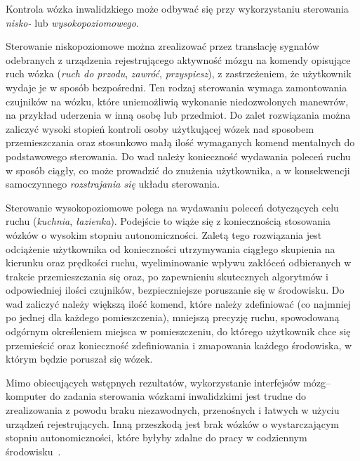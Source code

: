 \documentclass[skorowidz,skroty]{dyplomWEZUT}
\begin{document}
Kontrola wózka inwalidzkiego może odbywać się przy wykorzystaniu sterowania \textit{nisko-} lub \textit{wysokopoziomowego}.

Sterowanie niskopoziomowe można zrealizować przez translację sygnałów odebranych z urządzenia rejestrującego aktywność mózgu na komendy opisujące ruch wózka (\textit{ruch do przodu}, \textit{zawróć}, \textit{przyspiesz}), z zastrzeżeniem, że użytkownik wydaje je w sposób bezpośredni. Ten rodzaj sterowania wymaga zamontowania czujników na wózku, które uniemożliwią wykonanie niedozwolonych manewrów, na przykład uderzenia w inną osobę lub przedmiot. Do zalet rozwiązania można zaliczyć wysoki stopień kontroli osoby użytkującej wózek nad sposobem przemieszczania oraz stosunkowo małą ilość wymaganych komend mentalnych do podstawowego sterowania. Do wad należy konieczność wydawania poleceń ruchu w sposób ciągły, co może prowadzić do znużenia użytkownika, a w konsekwencji samoczynnego \textit{rozstrajania się} układu sterowania.

Sterowanie wysokopoziomowe polega na wydawaniu poleceń dotyczących celu ruchu (\textit{kuchnia}, \textit{łazienka}). Podejście to wiąże się z koniecznością stosowania wózków o wysokim stopniu autonomiczności. Zaletą tego rozwiązania jest odciążenie użytkownika od konieczności utrzymywania ciągłego skupienia na kierunku oraz prędkości ruchu, wyeliminowanie wpływu zakłóceń odbieranych w trakcie przemieszczania się oraz, po zapewnieniu skutecznych algorytmów i odpowiedniej ilości czujników, bezpieczniejsze poruszanie się w środowisku. Do wad zaliczyć należy większą ilość komend, które należy zdefiniować (co najmniej po jednej dla każdego pomieszczenia), mniejszą precyzję ruchu, spowodowaną odgórnym określeniem miejsca w pomieszczeniu, do którego użytkownik chce się przemieścić oraz konieczność zdefiniowania i zmapowania każdego środowiska, w którym będzie poruszał się wózek.

Mimo obiecujących wstępnych rezultatów, wykorzystanie interfejsów mózg--kom\-pu\-ter do zadania sterowania wózkami inwalidzkimi jest trudne do zrealizowania z powodu braku niezawodnych, przenośnych i łatwych w użyciu urządzeń rejestrujących. Inną przeszkodą jest brak wózków o wystarczającym stopniu autonomiczności, które byłyby zdalne do pracy w codziennym środowisku~\cite{bci_introduction}.
\end{document}
